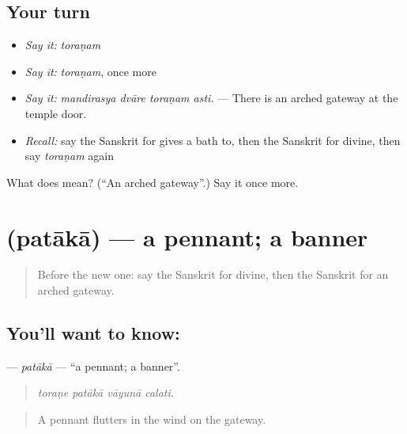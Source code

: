 \subsection*{Your turn}
\begin{itemize}
\raggedright
  \item \emph{Say it:} \emph{toraṇam}
  \item \emph{Say it:} \emph{toraṇam}, once more
  \item \emph{Say it:} \emph{mandirasya dvāre toraṇam asti.} — There is an arched gateway at the temple door.
  \item \emph{Recall:} say the Sanskrit for gives a bath to, then the Sanskrit for divine, then say \emph{toraṇam} again
\end{itemize}

\begin{tcolorbox}[breakable,colback=teal!4,colframe=teal!35!black,title={Before you move on}]
What does  mean? (\textquotedblleft{}An arched gateway\textquotedblright{}.) Say it once more.
\end{tcolorbox}
\section[\texorpdfstring{\sk{पताका} (patākā)}{पताका (patākā)}]{ (patākā) — a pennant; a banner}

\label{lesson:SA-C399-pataka}



\begin{quote}
Before the new one: say the Sanskrit for divine, then the Sanskrit for an arched gateway.
\end{quote}

\subsection*{You'll want to know: }
\textbf{} — \emph{patākā} — \textquotedblleft{}a pennant; a banner\textquotedblright{}.

\begin{quote}
   
\end{quote}

\begin{quote}
\emph{toraṇe patākā vāyunā calati.}
\end{quote}

\begin{quote}
A pennant flutters in the wind on the gateway.
\end{quote}

